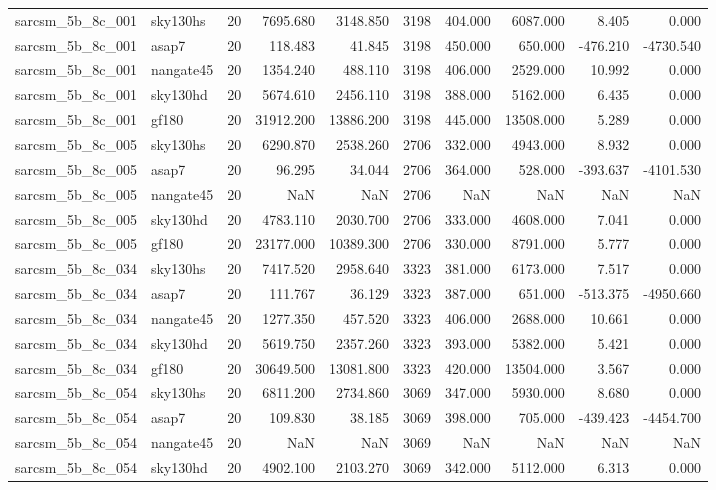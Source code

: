 \begin{longtable}{llrrrrrrrr}
sarcsm\_5b\_8c\_001 & sky130hs & 20 & 7695.680 & 3148.850 & 3198 & 404.000 & 6087.000 & 8.405 & 0.000 \\
sarcsm\_5b\_8c\_001 & asap7 & 20 & 118.483 & 41.845 & 3198 & 450.000 & 650.000 & -476.210 & -4730.540 \\
sarcsm\_5b\_8c\_001 & nangate45 & 20 & 1354.240 & 488.110 & 3198 & 406.000 & 2529.000 & 10.992 & 0.000 \\
sarcsm\_5b\_8c\_001 & sky130hd & 20 & 5674.610 & 2456.110 & 3198 & 388.000 & 5162.000 & 6.435 & 0.000 \\
sarcsm\_5b\_8c\_001 & gf180 & 20 & 31912.200 & 13886.200 & 3198 & 445.000 & 13508.000 & 5.289 & 0.000 \\
sarcsm\_5b\_8c\_005 & sky130hs & 20 & 6290.870 & 2538.260 & 2706 & 332.000 & 4943.000 & 8.932 & 0.000 \\
sarcsm\_5b\_8c\_005 & asap7 & 20 & 96.295 & 34.044 & 2706 & 364.000 & 528.000 & -393.637 & -4101.530 \\
sarcsm\_5b\_8c\_005 & nangate45 & 20 & NaN & NaN & 2706 & NaN & NaN & NaN & NaN \\
sarcsm\_5b\_8c\_005 & sky130hd & 20 & 4783.110 & 2030.700 & 2706 & 333.000 & 4608.000 & 7.041 & 0.000 \\
sarcsm\_5b\_8c\_005 & gf180 & 20 & 23177.000 & 10389.300 & 2706 & 330.000 & 8791.000 & 5.777 & 0.000 \\
sarcsm\_5b\_8c\_034 & sky130hs & 20 & 7417.520 & 2958.640 & 3323 & 381.000 & 6173.000 & 7.517 & 0.000 \\
sarcsm\_5b\_8c\_034 & asap7 & 20 & 111.767 & 36.129 & 3323 & 387.000 & 651.000 & -513.375 & -4950.660 \\
sarcsm\_5b\_8c\_034 & nangate45 & 20 & 1277.350 & 457.520 & 3323 & 406.000 & 2688.000 & 10.661 & 0.000 \\
sarcsm\_5b\_8c\_034 & sky130hd & 20 & 5619.750 & 2357.260 & 3323 & 393.000 & 5382.000 & 5.421 & 0.000 \\
sarcsm\_5b\_8c\_034 & gf180 & 20 & 30649.500 & 13081.800 & 3323 & 420.000 & 13504.000 & 3.567 & 0.000 \\
sarcsm\_5b\_8c\_054 & sky130hs & 20 & 6811.200 & 2734.860 & 3069 & 347.000 & 5930.000 & 8.680 & 0.000 \\
sarcsm\_5b\_8c\_054 & asap7 & 20 & 109.830 & 38.185 & 3069 & 398.000 & 705.000 & -439.423 & -4454.700 \\
sarcsm\_5b\_8c\_054 & nangate45 & 20 & NaN & NaN & 3069 & NaN & NaN & NaN & NaN \\
sarcsm\_5b\_8c\_054 & sky130hd & 20 & 4902.100 & 2103.270 & 3069 & 342.000 & 5112.000 & 6.313 & 0.000 \\

\end{longtable}
